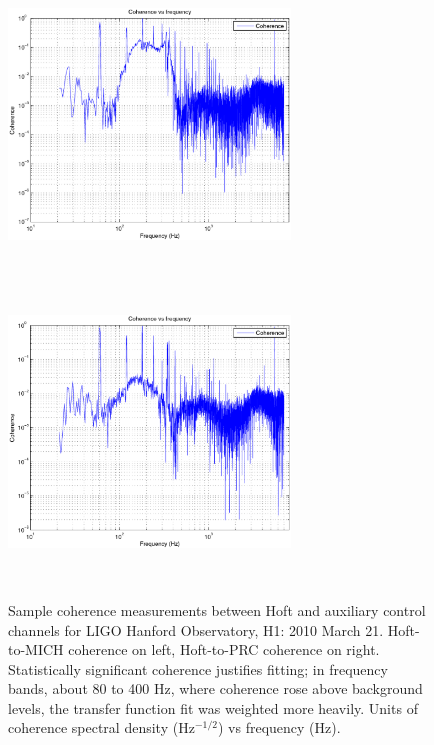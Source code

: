 \begin{figure}
\begin{center}
\includegraphics[height=80mm, width=75mm]{figure2a.eps}
\includegraphics[height=80mm, width=75mm]{figure2b.eps}
\caption{Sample coherence measurements between Hoft and auxiliary control channels for LIGO Hanford Observatory, H1: 2010 March 21. Hoft-to-MICH coherence on left, Hoft-to-PRC coherence on right. Statistically significant coherence justifies fitting; in frequency bands, about 80 to 400 Hz, where coherence rose above background levels, the transfer function fit was weighted more heavily. Units of coherence spectral density (Hz$^{-1/2}$) vs frequency (Hz).}
\label{coherenceGraph}
\end{center}
\end{figure}
